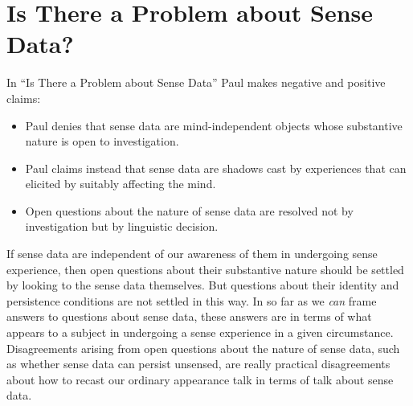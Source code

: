 \documentclass[11pt]{article}
\begin{document}

\section{Is There a Problem about Sense Data?} %
\label{sec:is_there_a_problem_about_sense_data_}
In ``Is There a Problem about Sense Data'' Paul makes negative and positive claims:
\begin{itemize}
    \item Paul denies that sense data are mind-independent objects whose substantive nature is open to investigation.
    \item Paul claims instead that sense data are shadows cast by experiences that can elicited by suitably affecting the mind.
    \item Open questions about the nature of sense data are resolved not by investigation but by linguistic decision.
\end{itemize}

If sense data are independent of our awareness of them in undergoing sense experience, then open questions about their substantive nature should be settled by looking to the sense data themselves. But questions about their identity and persistence conditions are not settled in this way. In so far as we \emph{can} frame answers to questions about sense data, these answers are in terms of what appears to a subject in undergoing a sense experience in a given circumstance. Disagreements arising from open questions about the nature of sense data, such as whether sense data can persist unsensed, are really practical disagreements about how to recast our ordinary appearance talk in terms of talk about sense data.
\end{document}
